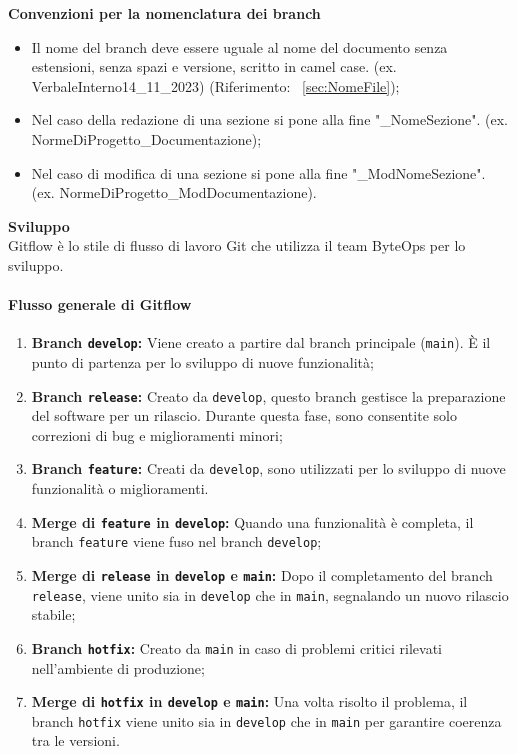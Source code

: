 \textbf{Convenzioni per la nomenclatura dei branch} \\
\begin{itemize}
    \item Il nome del branch deve essere uguale al nome del documento senza estensioni, senza spazi e versione, scritto in camel case. (ex. VerbaleInterno14\_11\_2023) (Riferimento: ~\ref{sec:NomeFile});
    \item Nel caso della redazione di una sezione si pone alla fine "\_NomeSezione". (ex. NormeDiProgetto\_Documentazione);
    \item Nel caso di modifica di una sezione si pone alla fine "\_ModNomeSezione". (ex. NormeDiProgetto\_ModDocumentazione).
\end{itemize}

\textbf{Sviluppo} \\
Gitflow è lo stile di flusso di lavoro Git che utilizza il team ByteOps per lo sviluppo.

\paragraph*{Flusso generale di Gitflow}

\begin{enumerate}
    \item \textbf{Branch \texttt{develop}:} Viene creato a partire dal branch principale (\texttt{main}). È il punto di partenza per lo sviluppo di nuove funzionalità;

    \item \textbf{Branch \texttt{release}:} Creato da \texttt{develop}, questo branch gestisce la preparazione del software per un rilascio. Durante questa fase, sono consentite solo correzioni di bug e miglioramenti minori;

    \item \textbf{Branch \texttt{feature}:} Creati da \texttt{develop}, sono utilizzati per lo sviluppo di nuove funzionalità o miglioramenti. 

    \item \textbf{Merge di \texttt{feature} in \texttt{develop}:} Quando una funzionalità è completa, il branch \texttt{feature} viene fuso nel branch \texttt{develop};

    \item \textbf{Merge di \texttt{release} in \texttt{develop} e \texttt{main}:} Dopo il completamento del branch \texttt{release}, viene unito sia in \texttt{develop} che in \texttt{main}, segnalando un nuovo rilascio stabile;

    \item \textbf{Branch \texttt{hotfix}:} Creato da \texttt{main} in caso di problemi critici rilevati nell'ambiente di produzione;

    \item \textbf{Merge di \texttt{hotfix} in \texttt{develop} e \texttt{main}:} Una volta risolto il problema, il branch \texttt{hotfix} viene unito sia in \texttt{develop} che in \texttt{main} per garantire coerenza tra le versioni.
\end{enumerate}

